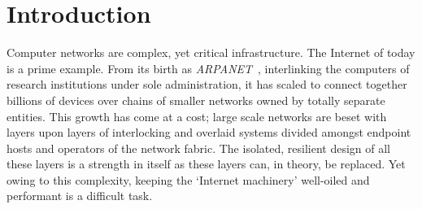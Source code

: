 \chapter{Introduction}\label{chap:intro}


Computer networks are complex, yet critical infrastructure.
The Internet of today is a prime example.
From its birth as \emph{ARPANET}~\parencite{DBLP:conf/afips/HeartKOCW70}, interlinking the computers of research institutions under sole administration, it has scaled to connect together billions of devices over chains of smaller networks owned by totally separate entities.
This growth has come at a cost; large scale networks are beset with layers upon layers of interlocking and overlaid systems divided amongst endpoint hosts and operators of the network fabric.
The isolated, resilient design of all these layers is a strength in itself as these layers can, in theory, be replaced.
Yet owing to this complexity, keeping the `Internet machinery' well-oiled and performant is a difficult task.


